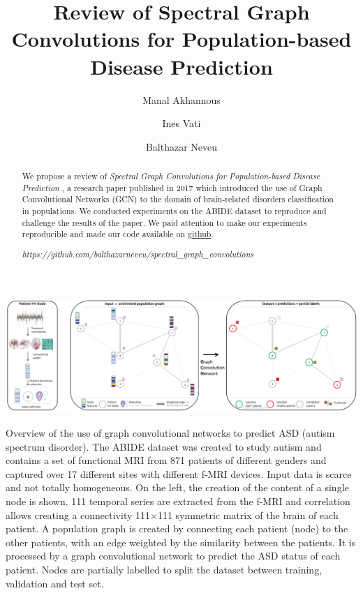 \documentclass[sigconf,authorversion,nonacm]{acmart}
\begin{document}
\title{Review of Spectral Graph Convolutions for Population-based Disease Prediction}

\author{Manal Akhannous}

\author{Ines Vati}

\author{Balthazar Neveu}


\renewcommand{\shortauthors}{Akhannous, Vati, Neveu}

\begin{abstract}
We propose a review of \textit{Spectral Graph Convolutions for Population-based Disease Prediction} \cite{Parisot17},
a research paper published in 2017 which introduced the use of Graph Convolutional Networks (GCN)
to the domain of brain-related disorders classification in populations.
We conducted experiments on the ABIDE dataset to reproduce and challenge the results of the paper.
We paid attention to make our experiments reproducible and made our code available on \href{https://github.com/balthazarneveu/spectral_graph_convolutions}{github}.

\textit{https://github.com/balthazarneveu/spectral\_graph\_convolutions}

\end{abstract}

\begin{teaserfigure}
  \includegraphics[width=\textwidth]{figures/spectral_graph_convolution_graph_overview.png}
  \caption{Overview of the use of graph convolutional networks to predict ASD (autism spectrum disorder).
  The ABIDE dataset was created to study autism and contains a set of functional MRI from 871 patients 
  of different genders and captured over 17 different sites with different f-MRI devices. Input data is scarce and not totally homogeneous.
  On the left, the creation of the content of a single node is shown. 111 temporal series are extracted from the f-MRI and correlation allows creating a connectivity 111×111 symmetric matrix of the brain of each patient.
  A population graph is created by connecting each patient (node) to the other patients, with an edge weighted by the similarity between the patients.
  It is processed by a graph convolutional network to predict the ASD status of each patient.
  Nodes are partially labelled to split the dataset between training, validation and test set.
  }
  \Description{}
  \label{fig:overview}
\end{teaserfigure}
\end{document}
